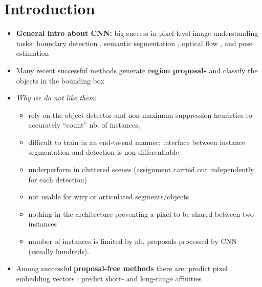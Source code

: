 
\section{Introduction}

\begin{itemize}
\item \textbf{General intro about CNN:} big success in pixel-level image understanding tasks: boundary detection \cite{arbelaez2011contour,xie2015holistically,maninis2018convolutional}, semantic segmentation \cite{long2015fully,chen2018deeplab,kong2018recurrent}, optical flow \cite{weinzaepfel2013deepflow,dosovitskiy2015flownet}, and pose estimation \cite{wei2016convolutional,cao2017realtime}
\item Many recent successful methods generate \textbf{region proposals} and classify the objects in the bounding box \cite{yang2012layered,ladicky2010and,hariharan2014simultaneous,chen2015multi,dai2016instance,liang2016reversible,he2017mask}
\item \emph{Why we do not like them}:
\begin{itemize}
\item rely on the object detector and non-maximum suppression heuristics to accurately “count” nb. of instances, 
\item difficult to train in an end-to-end manner: interface between instance segmentation and detection is non-differentiable
\item underperform in cluttered scenes (assignment carried out independently for each detection) 
\item not usable for wiry or articulated segments/objects 
\item nothing in the architecture preventing a pixel to be shared between two instances
\item number of instances is limited by nb. proposals processed by CNN (usually hundreds). 
\end{itemize}

\item Among successful \textbf{proposal-free methods} there are: predict pixel embedding vectors \cite{kong2018recurrent,fathi2017semantic,newell2017associative,de2017semantic}; predict short- and long-range affinities \cite{liu2018affinity,wolf2018mutex,xie2015holistically}


\end{itemize}
